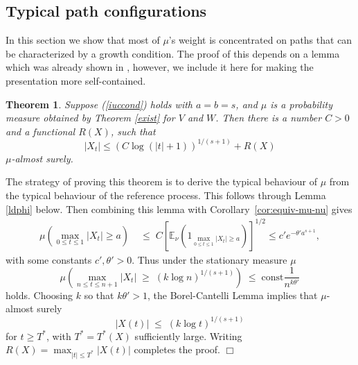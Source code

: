 \documentclass[a4paper,11pt]{article}
\newtheorem{theorem}{Theorem}[section]
\newenvironment{proof}[1][Proof]{{\sc #1.} }{\hfill $\Box$}
\newcommand{\expect}{\mathbb{E}}
\newcounter {constant}
\begin{document}
\subsection{Typical path configurations}
In this section we show that most of $\mu$'s weight is
concentrated on paths that can be characterized by a growth 
condition. The proof of this depends on a lemma which was
already shown in \cite{LM}, however, we include it here for 
making the presentation more self-contained.   
\begin{theorem}
Suppose (\ref{iuccond}) holds with $a = b = s$, and
$\mu$ is a probability measure obtained by Theorem \ref{exist} 
for $V$ and $W$. Then there is a number $C > 0$ and a functional 
$R(X)$, such that 
\begin{equation}
|X_t| \leq \left(C \log (|t| + 1)\right)^{1/(s+1)} + R(X)
\end{equation}
$\mu$-almost surely.
\label{tpb}
\end{theorem}
\begin{proof}
The strategy of proving this theorem is to derive the typical 
behaviour of $\mu$ from the typical behaviour of the reference 
process. This follows through Lemma \ref{ldphi} below. Then
combining this lemma with Corollary~\ref{cor:equiv-mu-nu} gives
\begin{equation*}
  \begin{split}
\mu\left(\max_{0 \leq t \leq 1} |X_t| \geq a\right)
& \;\le \; 
C \left[\expect_\nu(1_{\max_{0 \leq t \leq 1} |X_t| \geq a})\right]^{1/2}      
\le  c'  e^{-\theta' a^{s+1}},
  \end{split}
\end{equation*}
with some constants $c',\theta' > 0$. Thus under the stationary 
measure $\mu$ 
\begin{equation}
\mu\left(\max_{n \leq t \leq n+1} |X_t| \; \geq \; 
(k\log n)^{1/(s+1)}\right) \; \leq \; \mbox{const} 
\frac{1}{n^{k \theta'}}
\end{equation}
holds. Choosing $k$ so that $k \theta' > 1$, the 
Borel-Cantelli Lemma implies that $\mu$-almost surely
\begin{equation}
|X(t)| \; \leq \; (k \log t)^{1/(s+1)}
\end{equation}
for $t \geq T^*$, with $T^* = T^*(X)$ sufficiently large. 
Writing $R(X) = \max_{|t| \leq T^*} |X(t)|$ completes the proof. 
\end{proof}
\end{document}
